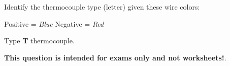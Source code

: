 

Identify the thermocouple type (letter) given these wire colors:

\vskip 10pt

Positive = {\it Blue} \hskip 50pt Negative = {\it Red}







Type {\bf T} thermocouple.







{\bf This question is intended for exams only and not worksheets!}.


